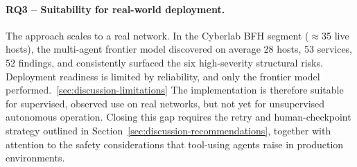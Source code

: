 \paragraph{RQ3 -- Suitability for real-world deployment.}
The approach scales to a real network.
In the Cyberlab BFH segment (\(\approx\)35 live hosts), the multi-agent frontier model discovered on average 28 hosts,
53 services, 52 findings, and consistently surfaced the six high-severity structural risks.
Deployment readiness is limited by reliability, and only the frontier model performed.~\ref{sec:discussion-limitations}
The implementation is therefore suitable for supervised, observed use on real networks, but not yet for
unsupervised autonomous operation.
Closing this gap requires the retry and human-checkpoint strategy outlined in
Section~\ref{sec:discussion-recommendations}, together with attention to the safety considerations that tool-using
agents raise in production environments.
